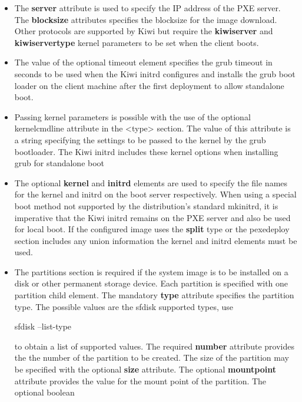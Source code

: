 \begin{itemize}
	\begin {itemize}
	\item The \textbf{server} attribute is used to specify the IP address
      of the PXE server. The \textbf{blocksize} attributes specifies the
      blocksize for the image download. Other protocols are supported by
      Kiwi but require the \textbf{kiwiserver} and \textbf{kiwiservertype}
      kernel parameters to be set when the client boots.
	\item The value of the optional timeout element specifies the grub
      timeout in seconds to be used when the Kiwi initrd configures and
      installs the grub boot loader on the client machine after the first
      deployment to allow standalone boot.
	\item Passing kernel parameters is possible with the use of the
      optional kernelcmdline attribute in the <type> section. The value
      of this attribute is a string specifying the settings to be
      passed to the kernel by the grub bootloader. The Kiwi initrd
      includes these kernel options when installing grub for standalone boot
	\item The optional \textbf{kernel} and \textbf{initrd} elements are
      used to specify the file names for the kernel and initrd on the boot
      server respectively. When using a special boot method not supported
      by the distribution's standard mkinitrd, it is imperative that the
      Kiwi initrd remains on the PXE server and also be used for local boot.
      If the configured image uses the \textbf{split} type or the pexedeploy
      section includes any union information the kernel and initrd elements
      must be used.
	\item The partitions section is required if the system image is to be
      installed on a disk or other permanent storage device. Each partition
      is specified with one partition child element. The mandatory
      \textbf{type} attribute specifies the partition type. The possible
      values are the sfdisk supported types, use
      \begin{Command}{14cm}
      sfdisk --list-type
      \end{Command}
      to obtain a list of supported values. The required \textbf{number}
      attribute provides the the number of the partition to be created. The
      size of the partition may be specified with the optional \textbf{size}
      attribute. The optional \textbf{mountpoint} attribute provides
      the value for the mount point of the partition. The optional boolean

\end{itemize}
\end{itemize}
